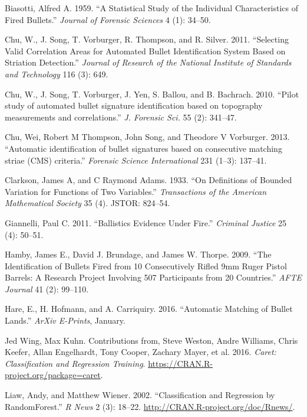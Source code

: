 \documentclass[12pt,]{article}
\theoremstyle{definition}
\theoremstyle{definition}
\theoremstyle{definition}
\theoremstyle{remark}
\begin{document}
\hypertarget{refs}{}
\hypertarget{ref-biasotti:1959}{}
Biasotti, Alfred A. 1959. ``A Statistical Study of the Individual
Characteristics of Fired Bullets.'' \emph{Journal of Forensic Sciences}
4 (1): 34--50.

\hypertarget{ref-chu:2011}{}
Chu, W., J. Song, T. Vorburger, R. Thompson, and R. Silver. 2011.
``Selecting Valid Correlation Areas for Automated Bullet Identification
System Based on Striation Detection.'' \emph{Journal of Research of the
National Institute of Standards and Technology} 116 (3): 649.

\hypertarget{ref-chu:2010}{}
Chu, W., J. Song, T. Vorburger, J. Yen, S. Ballou, and B. Bachrach.
2010. ``Pilot study of automated bullet signature identification based
on topography measurements and correlations.'' \emph{J. Forensic Sci.}
55 (2): 341--47.

\hypertarget{ref-thompson:2013}{}
Chu, Wei, Robert M Thompson, John Song, and Theodore V Vorburger. 2013.
``Automatic identification of bullet signatures based on consecutive
matching striae (CMS) criteria.'' \emph{Forensic Science International}
231 (1--3): 137--41.

\hypertarget{ref-clarkson1933definitions}{}
Clarkson, James A, and C Raymond Adams. 1933. ``On Definitions of
Bounded Variation for Functions of Two Variables.'' \emph{Transactions
of the American Mathematical Society} 35 (4). JSTOR: 824--54.

\hypertarget{ref-giannelli:2011}{}
Giannelli, Paul C. 2011. ``Ballistics Evidence Under Fire.''
\emph{Criminal Justice} 25 (4): 50--51.

\hypertarget{ref-hamby:2009}{}
Hamby, James E., David J. Brundage, and James W. Thorpe. 2009. ``The
Identification of Bullets Fired from 10 Consecutively Rifled 9mm Ruger
Pistol Barrels: A Research Project Involving 507 Participants from 20
Countries.'' \emph{AFTE Journal} 41 (2): 99--110.

\hypertarget{ref-2016arXiv160105788H}{}
Hare, E., H. Hofmann, and A. Carriquiry. 2016. ``Automatic Matching of
Bullet Lands.'' \emph{ArXiv E-Prints}, January.

\hypertarget{ref-caretpkg}{}
Jed Wing, Max Kuhn. Contributions from, Steve Weston, Andre Williams,
Chris Keefer, Allan Engelhardt, Tony Cooper, Zachary Mayer, et al. 2016.
\emph{Caret: Classification and Regression Training}.
\url{https://CRAN.R-project.org/package=caret}.

\hypertarget{ref-randomForest}{}
Liaw, Andy, and Matthew Wiener. 2002. ``Classification and Regression by
RandomForest.'' \emph{R News} 2 (3): 18--22.
\url{http://CRAN.R-project.org/doc/Rnews/}.
\end{document}
